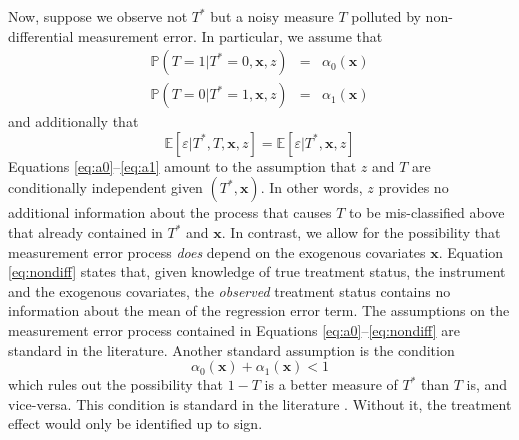 Now, suppose we observe not $T^*$ but a noisy measure $T$ polluted by non-differential measurement error.
In particular, we assume that
\begin{eqnarray}
  \label{eq:a0}
  \mathbb{P}(T = 1| T^* = 0, \mathbf{x}, z)  &=&  \alpha_0(\mathbf{x})\\
  \label{eq:a1}
  \mathbb{P}(T = 0| T^* = 1, \mathbf{x}, z)  &=&  \alpha_1(\mathbf{x})
\end{eqnarray}
and additionally that
\begin{equation}
  \mathbb{E}[\varepsilon|T^*,T,\mathbf{x},z] =  \mathbb{E}[\varepsilon|T^*,\mathbf{x},z]
  \label{eq:nondiff}
\end{equation}
Equations \ref{eq:a0}--\ref{eq:a1} amount to the assumption that $z$ and $T$ are conditionally independent given $(T^*,\mathbf{x})$. 
In other words, $z$ provides no additional information about the process that causes $T$ to be mis-classified above that already contained in $T^*$ and $\mathbf{x}$.
In contrast, we allow for the possibility that measurement error process \emph{does} depend on the exogenous covariates $\mathbf{x}$. 
Equation \ref{eq:nondiff} states that, given knowledge of true treatment status, the instrument and the exogenous covariates, the \emph{observed} treatment status contains no information about the mean of the regression error term.  
The assumptions on the measurement error process contained in Equations \ref{eq:a0}--\ref{eq:nondiff} are standard in the literature.
Another standard assumption is the condition
\begin{equation}
  \alpha_0(\mathbf{x}) + \alpha_1(\mathbf{x}) < 1
  \label{eq:alphaIneq}
\end{equation}
which rules out the possibility that $1-T$ is a better measure of $T^*$ than $T$ is, and vice-versa.
This condition is standard in the literature \citep{Mahajan,Lewbel,FL,BBS,KRS}.
Without it, the treatment effect would only be identified up to sign.


